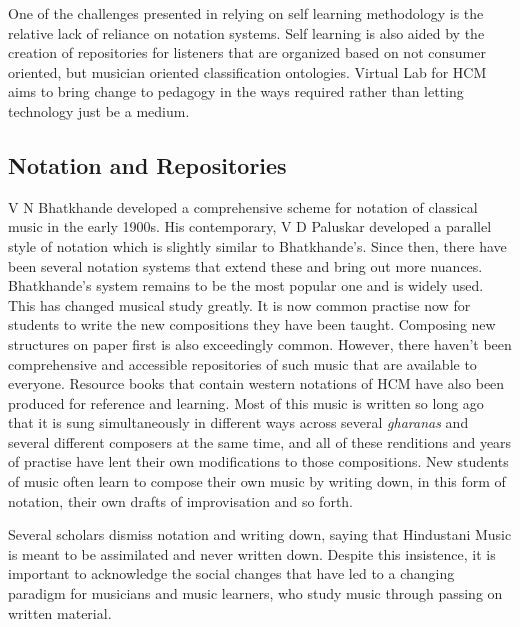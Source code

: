 \documentclass{tufte-handout}
\begin{document}
One of the challenges presented in relying on self learning methodology is the relative lack of reliance on notation systems. Self learning is also aided by the creation of repositories for listeners that are organized based on not consumer oriented, but musician oriented classification ontologies. Virtual Lab for HCM aims to bring change to pedagogy in the ways required rather than letting technology just be a medium. 

\subsection{Notation and Repositories} V N Bhatkhande developed a comprehensive scheme for notation of classical music in the early 1900s. \cite{bhatkhande} His contemporary, V D Paluskar developed a parallel style of notation which is slightly similar to Bhatkhande's. Since then, there have been several notation systems that extend these and bring out more nuances. Bhatkhande's system remains to be the most popular one and is widely used. This has changed musical study greatly. It is now common practise now for students to write the new compositions they have been taught. Composing new structures on paper first is also exceedingly common. However, there haven't been comprehensive and accessible repositories of such music that are available to everyone. Resource books that contain western notations of HCM have also been produced for reference and learning. \cite{kauffman} \cite{ragaguide} Most of this music is written so long ago that it is sung simultaneously in different ways across several \textit{gharanas} and several different composers at the same time, and all of these renditions and years of practise have lent their own modifications to those compositions.\cite{jairazbhoy} New students of music often learn to compose their own music by writing down, in this form of notation, their own drafts of improvisation and so forth. 

Several scholars dismiss notation and writing down, saying that Hindustani Music is meant to be assimilated and never written down. Despite this insistence, it is important to acknowledge the social changes that have led to a changing paradigm for musicians and music learners, who study music through passing on written material.
\end{document}
